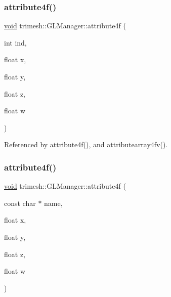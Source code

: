 \mbox{\label{classtrimesh_1_1GLManager_a02f45ce25a00bc3cb06209997c17bc33}} 
\subsubsection{\texorpdfstring{attribute4f()}{attribute4f()}\hspace{0.1cm}{\footnotesize\ttfamily [1/2]}}
{\footnotesize\ttfamily \hyperlink{namespacetrimesh_a784ddfd979e1c579bda795a8edfc3f43}{void} trimesh\+::\+G\+L\+Manager\+::attribute4f (\begin{DoxyParamCaption}\item[{int}]{ind,  }\item[{float}]{x,  }\item[{float}]{y,  }\item[{float}]{z,  }\item[{float}]{w }\end{DoxyParamCaption})}



Referenced by attribute4f(), and attributearray4fv().

\mbox{\label{classtrimesh_1_1GLManager_a06018f110f12aa1eb64eae6973d7571b}} 
\subsubsection{\texorpdfstring{attribute4f()}{attribute4f()}\hspace{0.1cm}{\footnotesize\ttfamily [2/2]}}
{\footnotesize\ttfamily \hyperlink{namespacetrimesh_a784ddfd979e1c579bda795a8edfc3f43}{void} trimesh\+::\+G\+L\+Manager\+::attribute4f (\begin{DoxyParamCaption}\item[{const char $\ast$}]{name,  }\item[{float}]{x,  }\item[{float}]{y,  }\item[{float}]{z,  }\item[{float}]{w }\end{DoxyParamCaption})\hspace{0.3cm}{\ttfamily [inline]}}

